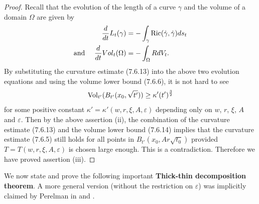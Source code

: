 \begin{proof}
Recall that the evolution of the length of a curve $\gamma$ and
the volume of a domain $\Omega$ are given by
\begin{align*}
\frac{d}{dt}L_t(\gamma)
&=-\int_{\gamma}\operatorname{Ric}(\dot{\gamma},\dot{\gamma})ds_t \\
\mbox{and } \quad \frac{d}{dt}Vol_t(\Omega) &=-\int_{\Omega}RdV_t.
\end{align*}
By substituting the curvature estimate (7.6.13) into the above two
evolution equations and using the volume lower bound (7.6.6), it
is not hard to see \begin{equation} \Vol_{t'}(B_{t'}(x_0,\sqrt{t'}))\geq
 \kappa'(t')^{\frac{3}{2}} %
\end{equation} for some positive constant
$\kappa'=\kappa'(w,r,\xi,A,\varepsilon)$ depending only on $w$,
$r$, $\xi$, $A$ and $\varepsilon$. Then by the above assertion
(ii), the combination of the curvature estimate (7.6.13) and the
volume lower bound (7.6.14) implies that the curvature estimate
(7.6.5) still holds for all points in $B_{t'}(x_0,Ar\sqrt{t_0})$
provided $T=T(w,r,\xi,A,\varepsilon)$ is chosen large enough. This
is a contradiction.  Therefore we have proved assertion (iii).
\end{proof}

We now state and prove the following important \textbf{Thick-thin
decomposition theorem}. A
more general version (without the restriction on $\varepsilon$)
was implicitly claimed by Perelman in \cite{P1} and \cite{P2}.

